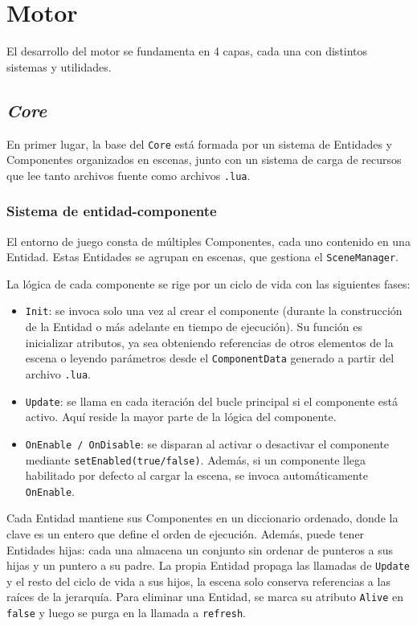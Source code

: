\chapter{Motor}
\label{cap:motor}

El desarrollo del motor se fundamenta en 4 capas, cada una con distintos sistemas y utilidades. 

\section{\textit{Core}}
En primer lugar, la base del \texttt{Core} está formada por un sistema de Entidades y Componentes organizados en escenas, junto con un sistema de carga de recursos que lee tanto archivos fuente como archivos \texttt{.lua}.

\subsection{Sistema de entidad-componente}
El entorno de juego consta de múltiples Componentes, cada uno contenido en una Entidad. Estas Entidades se agrupan en escenas, que gestiona el \texttt{SceneManager}.

\smallskip

La lógica de cada componente se rige por un ciclo de vida con las siguientes fases: 

\begin{itemize}
	\item \texttt{Init}: se invoca solo una vez al crear el componente (durante la construcción de la Entidad o más adelante en tiempo de ejecución). Su función es inicializar atributos, ya sea obteniendo referencias de otros elementos de la escena o leyendo parámetros desde el \texttt{ComponentData} generado a partir del archivo \texttt{.lua}.
	\item \texttt{Update}: se llama en cada iteración del bucle principal si el componente está activo. Aquí reside la mayor parte de la lógica del componente.
	\item \texttt{OnEnable / OnDisable}: se disparan al activar o desactivar el componente mediante \texttt{setEnabled(true/false)}. Además, si un componente llega habilitado por defecto al cargar la escena, se invoca automáticamente \texttt{OnEnable}.
\end{itemize}

\medskip

Cada Entidad mantiene sus Componentes en un diccionario ordenado, donde la clave es un entero que define el orden de ejecución. Además, puede tener Entidades hijas: cada una almacena un conjunto sin ordenar de punteros a sus hijas y un puntero a su padre. La propia Entidad propaga las llamadas de \texttt{Update} y el resto del ciclo de vida a sus hijos, la escena solo conserva referencias a las raíces de la jerarquía. Para eliminar una Entidad, se marca su atributo \texttt{Alive} en \texttt{false} y luego se purga en la llamada a \texttt{refresh}.

